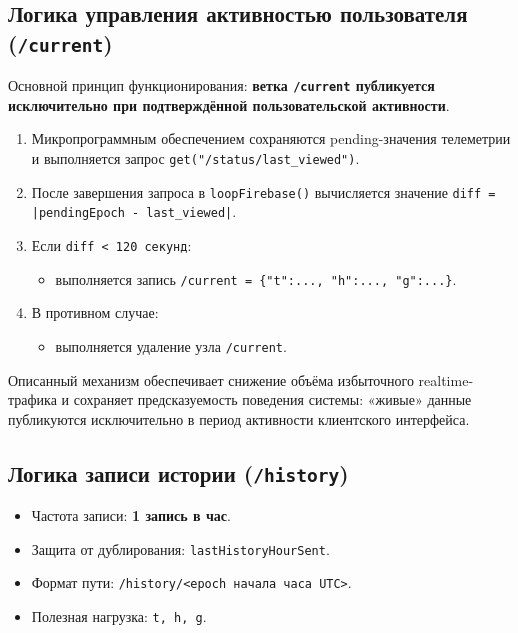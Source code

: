 \subsection{Логика управления активностью пользователя (\texttt{/current})}

Основной принцип функционирования: \textbf{ветка \texttt{/current} публикуется исключительно при подтверждённой пользовательской активности}.

\begin{enumerate}
    \item Микропрограммным обеспечением сохраняются pending-значения телеметрии и выполняется запрос \texttt{get("/status/last\_viewed")}.
    \item После завершения запроса в \texttt{loopFirebase()} вычисляется значение \texttt{diff = |pendingEpoch - last\_viewed|}.
    \item Если \texttt{diff < 120 секунд}:
    \begin{itemize}
        \item выполняется запись \texttt{/current = \{"t":..., "h":..., "g":...\}}.
    \end{itemize}
    \item В противном случае:
    \begin{itemize}
        \item выполняется удаление узла \texttt{/current}.
    \end{itemize}
\end{enumerate}

Описанный механизм обеспечивает снижение объёма избыточного realtime-трафика и сохраняет предсказуемость поведения системы: «живые» данные публикуются исключительно в период активности клиентского интерфейса.

\subsection{Логика записи истории (\texttt{/history})}

\begin{itemize}
    \item Частота записи: \textbf{1 запись в час}.
    \item Защита от дублирования: \texttt{lastHistoryHourSent}.
    \item Формат пути: \texttt{/history/<epoch начала часа UTC>}.
    \item Полезная нагрузка: \texttt{t, h, g}.
\end{itemize}

